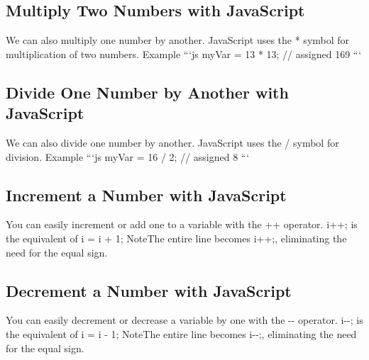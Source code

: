 \documentclass{article}%
\begin{document}
%
\subsection{Multiply Two Numbers with JavaScript}%
\label{subsec:MultiplyTwoNumberswithJavaScript}%
We can also multiply one number by another.\newline%
JavaScript uses the * symbol for multiplication of two numbers.\newline%
Example\newline%
```js\newline%
myVar = 13 * 13; // assigned 169\newline%
```\newline%

%
\subsection{Divide One Number by Another with JavaScript}%
\label{subsec:DivideOneNumberbyAnotherwithJavaScript}%
We can also divide one number by another.\newline%
JavaScript uses the / symbol for division.\newline%
Example\newline%
```js\newline%
myVar = 16 / 2; // assigned 8\newline%
```\newline%

%
\subsection{Increment a Number with JavaScript}%
\label{subsec:IncrementaNumberwithJavaScript}%
You can easily increment or add one to a variable with the ++ operator.\newline%
i++;\newline%
is the equivalent of\newline%
i = i + 1;\newline%
NoteThe entire line becomes i++;, eliminating the need for the equal sign.\newline%

%
\subsection{Decrement a Number with JavaScript}%
\label{subsec:DecrementaNumberwithJavaScript}%
You can easily decrement or decrease a variable by one with the {-}{-} operator.\newline%
i{-}{-};\newline%
is the equivalent of\newline%
i = i {-} 1;\newline%
NoteThe entire line becomes i{-}{-};, eliminating the need for the equal sign.\newline%
\end{document}
